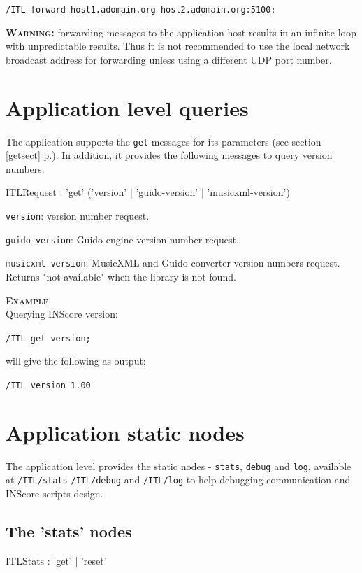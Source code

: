 \documentclass[a4paper,twoside]{report}
\newcommand{\sublevel}[1]	{\section{#1}}
\newcommand{\subsublevel}[1]	{\subsection{#1}}
\newcommand{\fullref}[1]	{\ref{#1} p.\pageref{#1}}
\newcommand{\OSC}[1]		{\texttt{#1}}
\newcommand{\example}		{\textbf{\hspace{-1.5cm}\textbf{\textsc{Example }}}}
\let\olditemize\itemize
\let\oldenditemize\enditemize
\renewenvironment{itemize} 	{\olditemize \setlength{\itemsep}{1mm}}{\oldenditemize}
\newcommand{\sample}	[1]			{\vspace{-2mm}\begin{center}\colorbox{mygrey}{
								\begin{minipage}[t]{0.9\columnwidth} 
								{\small \texttt{#1}}
								\end{minipage}}\end{center}}
\newcommand{\sampleindent}	{ \hspace{0.5cm} }
\newcommand{\warning}[1]	{\textbf{\textsc{Warning:}} #1}
\begin{document}
\sample{/ITL forward host1.adomain.org host2.adomain.org:5100;}

\warning{forwarding messages to the application host results in an infinite loop with unpredictable results. Thus it is not recommended to use the local network broadcast address for forwarding unless using a different UDP port number.}



\sublevel{Application level queries}
\label{ITLQuery}

The application supports the \OSC{get} messages for its parameters (see section \fullref{getsect}). In addition, it provides the following messages to query version numbers.

\begin{rail}
ITLRequest : 'get'  ('version' | 'guido-version' | 'musicxml-version')
\end{rail}

\begin{itemize}
\item \OSC{version}: version number request.
\item \OSC{guido-version}: Guido engine version number request.
\item \OSC{musicxml-version}: MusicXML and Guido converter version numbers request. Returns "not available" when the library is not found.

\end{itemize}

\example \\
Querying INScore version:
\sample{/ITL get version;}
\sampleindent will give the following as output:
\sample{/ITL version 1.00}

\sublevel{Application static nodes}
\label{ITLStatic}

The application level provides the static nodes - \OSC{stats}, \OSC{debug} and \OSC{log}, available at \OSC{/ITL/stats} \OSC{/ITL/debug} and \OSC{/ITL/log}  to help debugging communication and INScore scripts design.

\subsublevel{The 'stats' nodes}
\label{ITLstat}

\begin{rail}
ITLStats : 'get'  | 'reset'
\end{rail}
\end{document}
